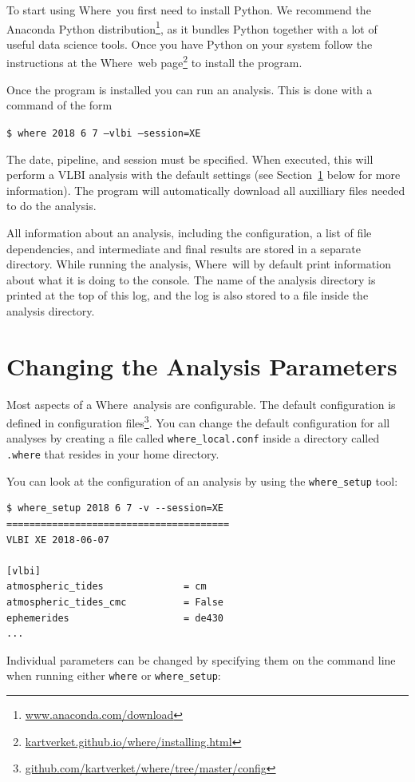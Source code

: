 \documentclass[twocolumn,twoside]{svmultivs_gm} %
\newcommand{\code}[1]{{\footnotesize\texttt{#1}}}
\newcommand{\where}{\textsf{Where}}
\begin{document}
To start using \where\ you first need to install Python. We recommend the Anaconda Python distribution\footnote{\url{www.anaconda.com/download}}, as it bundles Python together with a lot of useful data science tools. Once you have Python on your system follow the instructions at the \where\ web page\footnote{\url{kartverket.github.io/where/installing.html}} to install the program.

Once the program is installed you can run an analysis. This is done with a command of the form

\code{\$ where 2018 6 7 --vlbi --session=XE}

The date, pipeline, and session must be specified. When executed, this will perform a VLBI analysis with the default settings (see Section~\ref{sec:configuration} below for more information). The program will automatically download all auxilliary files needed to do the analysis.

All information about an analysis, including the configuration, a list of file dependencies, and intermediate and final results are stored in a separate directory. While running the analysis, \where\ will by default print information about what it is doing to the console. The name of the analysis directory is printed at the top of this log, and the log is also stored to a file inside the analysis directory.
%
\section{Changing the Analysis Parameters}
\label{sec:configuration}
%
Most aspects of a \where\ analysis are configurable. The default configuration is defined in configuration files\footnote{\url{github.com/kartverket/where/tree/master/config}}. You can change the default configuration for all analyses by creating a file called \code{where\_local.conf} inside a directory called \code{.where} that resides in your home directory.

You can look at the configuration of an analysis by using the \code{where\_setup} tool:

{\footnotesize\begin{verbatim}
$ where_setup 2018 6 7 -v --session=XE
=======================================
VLBI XE 2018-06-07

[vlbi]
atmospheric_tides              = cm
atmospheric_tides_cmc          = False
ephemerides                    = de430
...
\end{verbatim}}

Individual parameters can be changed by specifying them on the command line when running either \code{where} or \code{where\_setup}:
\end{document}
